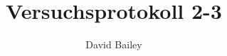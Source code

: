 \documentclass[11pt,a4paper]{report}
\author{David Bailey}
\title{Versuchsprotokoll 2-3}
\begin{document}
\maketitle

\makeindex
\end{document}

